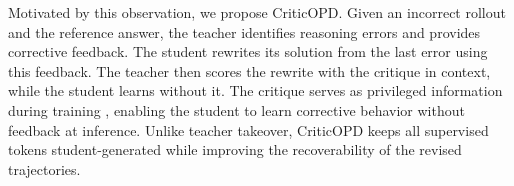 Motivated by this observation, we propose CriticOPD. Given an incorrect rollout and the reference answer, the teacher identifies reasoning errors and provides corrective feedback. The student rewrites its solution from the last error using this feedback. The teacher then scores the rewrite with the critique in context, while the student learns without it. The critique serves as privileged information during training \citep{vapnik2009lupi,lopezpaz2016unifying}, enabling the student to learn corrective behavior without feedback at inference. Unlike teacher takeover, CriticOPD keeps all supervised tokens student-generated while improving the recoverability of the revised trajectories.



